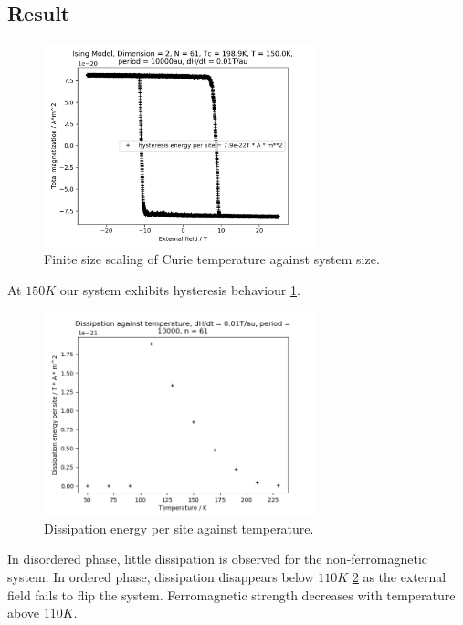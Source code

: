 \documentclass[%
showkeys,
bibnotes,
amsmath,amssymb,
floatfix,
]{revtex4-1}
\begin{document}
\subsection{\label{sec:level2}Result}

\begin{figure}[H] \centering
	\includegraphics[width=0.7\textwidth]{../figures/hysteresis_scan}
	\caption{\label{fig:hysteresis_scan} Finite size scaling of Curie temperature against system size.}
\end{figure}

At $150K$ our system exhibits hysteresis behaviour \ref{fig:hysteresis_scan}. 

\begin{figure}[H] \centering
	\includegraphics[width=0.7\textwidth]{../figures/hysteresis_dissipation}
	\caption{\label{fig:hysteresis_dissipation} Dissipation energy per site against temperature.}
\end{figure}

In disordered phase, little dissipation is observed for the non-ferromagnetic system. In ordered phase, dissipation disappears below $110K$ \ref{fig:hysteresis_dissipation} as the external field fails to flip the system. Ferromagnetic strength decreases with temperature above $110K$.
\end{document}
